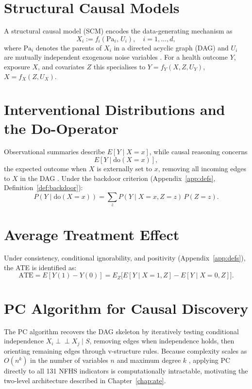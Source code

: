 \documentclass[12pt,a4paper]{report}
\begin{document}
\section{Structural Causal Models}

A structural causal model (SCM) encodes the data-generating mechanism as
\[
X_i := f_i(\mathrm{Pa}_i,\, U_i), \quad i = 1,\ldots,d,
\]
where $\mathrm{Pa}_i$ denotes the parents of $X_i$ in a directed acyclic graph
(DAG) and $U_i$ are mutually independent exogenous noise variables
\citep{pearl2009causality}.
For a health outcome $Y$, exposure $X$, and covariates $Z$ this specialises to
$Y = f_Y(X,Z,U_Y)$, $X = f_X(Z,U_X)$.

\section{Interventional Distributions and the Do-Operator}

Observational summaries describe $E[Y \mid X=x]$, while causal reasoning concerns
\[
E[Y \mid \mathrm{do}(X=x)],
\]
the expected outcome when $X$ is externally set to $x$, removing all incoming edges
to $X$ in the DAG \citep{pearl2009causality}.
Under the backdoor criterion (Appendix~\ref{app:defs}, Definition~\ref{def:backdoor}):
\[
P\!\left(Y \mid \mathrm{do}(X=x)\right) = \sum_z P(Y \mid X=x,Z=z)\,P(Z=z).
\]

\section{Average Treatment Effect}

Under consistency, conditional ignorability, and positivity
(Appendix~\ref{app:defs}), the ATE is identified as:
\begin{equation}
\mathrm{ATE}
= E[Y(1) - Y(0)]
= E_Z\!\bigl[E[Y \mid X=1,Z] - E[Y \mid X=0,Z]\bigr].
\label{eq:ate}
\end{equation}

\section{PC Algorithm for Causal Discovery}

The PC algorithm \citep{spirtes2000causation} recovers the DAG skeleton by
iteratively testing conditional independence $X_i \perp\!\!\!\perp X_j \mid S$,
removing edges when independence holds, then orienting remaining edges through
v-structure rules.
Because complexity scales as $O(n^k)$ in the number of variables $n$ and maximum
degree $k$ \citep{kalisch2007estimating}, applying PC directly to all 131 NFHS
indicators is computationally intractable, motivating the two-level architecture
described in Chapter~\ref{chap:ate}.
\end{document}
